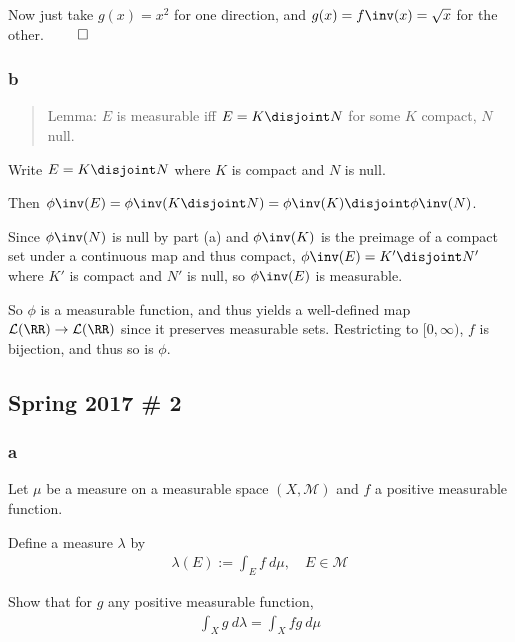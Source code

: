 \begin{solution}
Now just take \(g(x) = x^2\) for one direction, and
\(g(x) = f\inv(x) = \sqrt{x}\) for the other. \(\qed\)

\hypertarget{b-8}{%
\subsubsection{b}\label{b-8}}

\begin{quote}
Lemma: \(E\) is measurable iff \(E = K \disjoint N\) for some \(K\)
compact, \(N\) null.
\end{quote}

Write \(E = K \disjoint N\) where \(K\) is compact and \(N\) is null.

Then
\(\phi\inv(E) = \phi\inv(K \disjoint N) = \phi\inv(K) \disjoint \phi\inv(N)\).

Since \(\phi\inv(N)\) is null by part (a) and \(\phi\inv(K)\) is the
preimage of a compact set under a continuous map and thus compact,
\(\phi\inv(E) = K' \disjoint N'\) where \(K'\) is compact and \(N'\) is
null, so \(\phi\inv(E)\) is measurable.

So \(\phi\) is a measurable function, and thus yields a well-defined map
\(\mathcal L(\RR) \to \mathcal L(\RR)\) since it preserves measurable
sets. Restricting to \([0, \infty)\), \(f\) is bijection, and thus so is
\(\phi\).

\end{solution}

\hypertarget{spring-2017-2}{%
\subsection{Spring 2017 \# 2}\label{spring-2017-2}}

\hypertarget{a-9}{%
\subsubsection{a}\label{a-9}}

Let \(\mu\) be a measure on a measurable space \((X, \mathcal M)\) and
\(f\) a positive measurable function.

Define a measure \(\lambda\) by
\begin{align*}
\lambda(E):=\int_{E} f ~d \mu, \quad E \in \mathcal{M}
\end{align*}

Show that for \(g\) any positive measurable function,
\begin{align*}
\int_{X} g ~d \lambda=\int_{X} f g ~d \mu
\end{align*}

